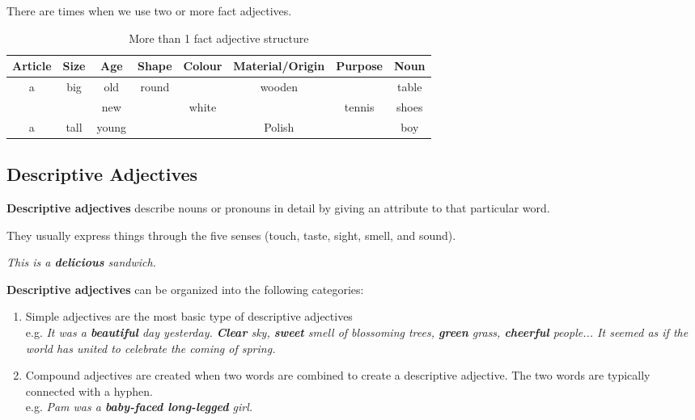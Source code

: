\documentclass[hidelinks,10pt,a4paper]{article}
\begin{document}
There are times when we use two or more fact adjectives.

\begin{table}[h]
\begin{center}
\begin{tabular}{|c|c|c|c|c|c|c|c|}
	\hline
	\textbf{Article} & \textbf{Size} & \textbf{Age} & \textbf{Shape} & \textbf{Colour} & \textbf{Material/Origin} & \textbf{Purpose} & \textbf{Noun} \\ \hline
	a & big   & old   & round &       & wooden  &         & table \\ \hline
	  &       & new   &       & white &         & tennis  & shoes \\ \hline
	a & tall  & young &       &       & Polish  &         & boy   \\ \hline
\end{tabular}
\end{center}
\caption{More than 1 fact adjective structure} \label{tab:adj2}
\end{table}

\subsection{Descriptive Adjectives}
\textbf{Descriptive adjectives} describe nouns or pronouns in detail by giving an attribute to that particular word.

They usually express things through the five senses (touch, taste, sight, smell, and sound).

\begin{center}
	\textit{This is a \textbf{delicious} sandwich.}
\end{center}

\textbf{Descriptive adjectives} can be organized into the following categories:

\begin{enumerate}[label=(\alph*)]
	\item Simple adjectives are the most basic type of descriptive adjectives \\
		e.g. \textit{It was a \textbf{beautiful} day yesterday. \textbf{Clear} sky, \textbf{sweet} smell of blossoming trees, \textbf{green} grass, \textbf{cheerful} people... It seemed as if the world has united to celebrate the coming of spring.}
	\item Compound adjectives are created when two words are combined to create a descriptive adjective. The two words are typically connected with a hyphen. \\
		e.g. \textit{Pam was a \textbf{baby-faced long-legged} girl.}
\end{enumerate}
\end{document}

